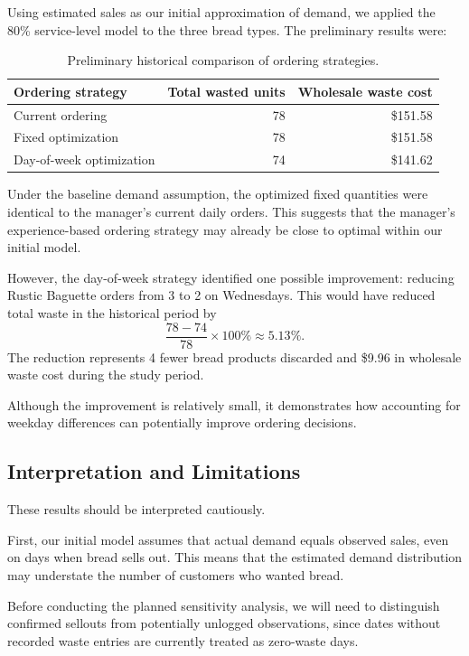 \documentclass[11pt]{article}
\begin{document}
Using estimated sales as our initial approximation of demand, we applied the 80\% service-level model to the three bread types. The preliminary results were:

\begin{table}[htbp]
\centering
\caption{Preliminary historical comparison of ordering strategies.}
\begin{tabular}{@{}lrr@{}}
\toprule
Ordering strategy & Total wasted units & Wholesale waste cost \\
\midrule
Current ordering & 78 & \$151.58 \\
Fixed optimization & 78 & \$151.58 \\
Day-of-week optimization & 74 & \$141.62 \\
\bottomrule
\end{tabular}
\end{table}

Under the baseline demand assumption, the optimized fixed quantities were identical to the manager's current daily orders. This suggests that the manager's experience-based ordering strategy may already be close to optimal within our initial model.

However, the day-of-week strategy identified one possible improvement: reducing Rustic Baguette orders from 3 to 2 on Wednesdays. This would have reduced total waste in the historical period by
\begin{equation}
\frac{78-74}{78}\times 100\%\approx 5.13\%.
\end{equation}
The reduction represents 4 fewer bread products discarded and \$9.96 in wholesale waste cost during the study period.

Although the improvement is relatively small, it demonstrates how accounting for weekday differences can potentially improve ordering decisions.

\subsection{Interpretation and Limitations}

These results should be interpreted cautiously.

First, our initial model assumes that actual demand equals observed sales, even on days when bread sells out. This means that the estimated demand distribution may understate the number of customers who wanted bread.

Before conducting the planned sensitivity analysis, we will need to distinguish confirmed sellouts from potentially unlogged observations, since dates without recorded waste entries are currently treated as zero-waste days.
\end{document}
